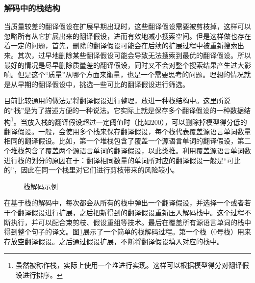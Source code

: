 
\subsubsection{解码中的栈结构}

\parinterval 当质量较差的翻译假设在扩展早期出现时，这些翻译假设需要被剪枝掉，这样可以忽略所有从它扩展出来的翻译假设，进而有效地减小搜索空间。但是这样做也存在着一定的问题，首先，删除的翻译假设可能会在后续的扩展过程中被重新搜索出来。其次，过早地删除某些翻译假设可能会导致无法搜索到最优的翻译假设。所以最好的情况是尽早删除质量差的翻译假设，同时又不会对整个搜索结果产生过大影响。但是这个``质量''从哪个方面来衡量，也是一个需要思考的问题。理想的情况就是从早期的翻译假设中，挑选一些可比的翻译假设进行筛选。

\parinterval 目前比较通用的做法是将翻译假设进行整理，放进一种栈结构中。这里所说的``栈''是为了描述方便的一种说法。它实际上就是保存多个翻译假设的一种数据结构\footnote[4]{虽然被称作栈，实际上使用一个堆进行实现。这样可以根据模型得分对翻译假设进行排序。}。当放入栈的翻译假设超过一定阈值时（比如200），可以删除掉模型得分低的翻译假设。一般，会使用多个栈来保存翻译假设，每个栈代表覆盖源语言单词数量相同的翻译假设。比如，第一个堆栈包含了覆盖一个源语言单词的翻译假设，第二个堆栈包含了覆盖两个源语言单词的翻译假设，以此类推。利用覆盖源语言单词数进行栈的划分的原因在于：翻译相同数量的单词所对应的翻译假设一般是``可比的''，因此在同一个栈里对它们进行剪枝带来的风险较小。

\begin{figure}[htp]
\centering

\caption{栈解码示例}
\label{fig:4-30}
\end{figure}

\parinterval 在基于栈的解码中，每次都会从所有的栈中弹出一个翻译假设，并选择一个或者若干个翻译假设进行扩展，之后把新得到的翻译假设重新压入解码栈中。这个过程不断执行，并可以配合束剪枝、假设重组等技术。最后在覆盖所有源语言单词的栈中得到整个句子的译文。图\ref{fig:4-30}展示了一个简单的栈解码过程。第一个栈（0号栈）用来存放空翻译假设。之后通过假设扩展，不断将翻译假设填入对应的栈中。



